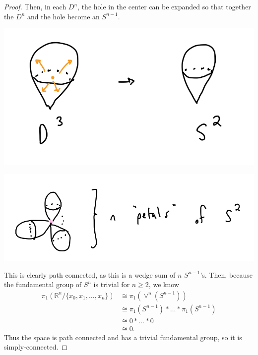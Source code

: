 \documentclass[12pt]{article}
\begin{document}
\begin{proof}
  \par Then, in each $D^n$, the hole in the center can be expanded so that together the $D^n$ and the hole become an $S^{n-1}$.
  \par \begin{center} \includegraphics[scale=.2]{1-4.jpg} \end{center}
  \par \begin{center} \includegraphics[scale=.2]{1-5.jpg} \end{center}
  \par This is clearly path connected, as this is a wedge sum of $n$ $S^{n-1}$'s. Then, because the fundamental group of $S^n$ is trivial for $n \geq 2$, we know 
 \begin{align*}
   \pi_1( \mathbb{R}^n / \{x_0, x_1, \dots, x_n\}) & \cong \pi_1(\vee^n(S^{n-1})) \\
                                                   & \cong \pi_1(S^{n-1}) \ast \dots \ast \pi_1(S^{n-1}) \\ 
                                                   & \cong 0 \ast \dots \ast 0 \\
                                                   & \cong 0.
 \end{align*}
 Thus the space is path connected and has a trivial fundamental group, so it is simply-connected.
\end{proof}
\end{document}
